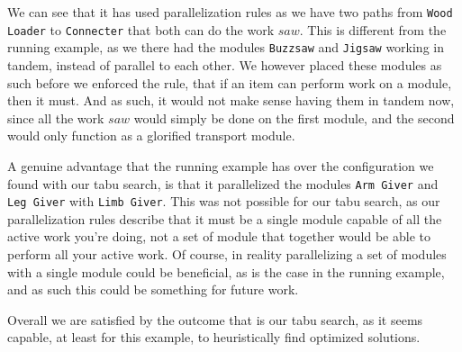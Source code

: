We can see that it has used parallelization rules as we have two paths from \texttt{Wood Loader} to \texttt{Connecter} that both can do the work $saw$. This is different from the running example, as we there had the modules \texttt{Buzzsaw} and \texttt{Jigsaw} working in tandem, instead of parallel to each other. We however placed these modules as such before we enforced the rule, that if an item can perform work on a module, then it must. And as such, it would not make sense having them in tandem now, since all the work $saw$ would simply be done on the first module, and the second would only function as a glorified transport module.

A genuine advantage that the running example has over the configuration we found with our tabu search, is that it parallelized the modules \texttt{Arm Giver} and \texttt{Leg Giver} with \texttt{Limb Giver}. This was not possible for our tabu search, as our parallelization rules describe that it must be a single module capable of all the active work you're doing, not a set of module that together would be able to perform all your active work. Of course, in reality parallelizing a set of modules with a single module could be beneficial, as is the case in the running example, and as such this could be something for future work.

Overall we are satisfied by the outcome that is our tabu search, as it seems capable, at least for this example, to heuristically find optimized solutions.
